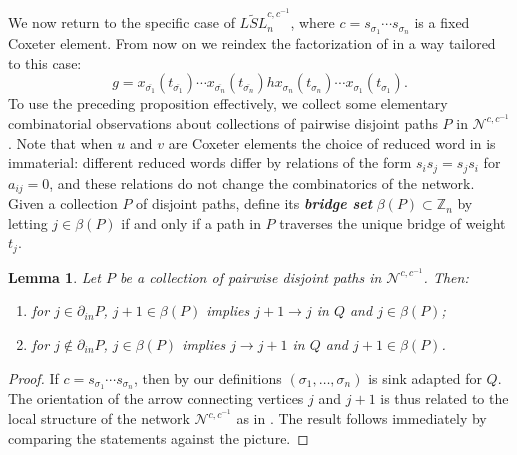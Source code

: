 \documentclass[12pt]{amsart}
\newcommand{\newword}[1]{\textbf{\emph{#1}}}
\newcommand{\ZZ}{\mathbb{Z}}
\newcommand{\cN}{\mathcal{N}} %
\newcommand{\ol}[1]{\overline{#1}}
\newtheorem{lemma}[theorem]{Lemma}
\theoremstyle{remark}
\numberwithin{equation}{section}
\numberwithin{figure}{section}
\begin{document}
We now return to the specific case of $\widetilde{LSL}_n^{c,c^{-1}}$, where $c = s_{\sigma_1}\cdots s_{\sigma_{n}}$ is a fixed Coxeter element.
From now on we reindex the factorization of  in a way tailored to this case:
\begin{equation}
  g = x_{\ol{\sigma_1}}(t_{\ol{\sigma_1}}) \cdots x_{\ol{\sigma_n}}(t_{\ol{\sigma_n}})h x_{\sigma_n}(t_{\sigma_n}) \cdots x_{\sigma_1}(t_{\sigma_1}).
  \label{eq:coxfactorization}
\end{equation}
To use the preceding proposition effectively, we collect some elementary combinatorial observations about collections of pairwise disjoint paths $P$ in $\cN^{c,c^{-1}}$.
Note that when $u$ and $v$ are Coxeter elements the choice of reduced word in  is immaterial: different reduced words differ by relations of the form $s_i s_j = s_j s_i$ for $a_{ij} = 0$, and these relations do not change the combinatorics of the network.
Given a collection $P$ of disjoint paths, define its \newword{bridge set} $\beta(P)\subset\ZZ_n$ by letting $j\in\beta(P)$ if and only if a path in $P$ traverses the unique bridge of weight $t_j$.

\begin{lemma}
  \label{lem:phi}
  Let $P$ be a collection of pairwise disjoint paths in $\cN^{c,c^{-1}}$.  Then:
  \begin{enumerate}
    \item for $j\in\partial_{in}P$, $j+1\in\beta(P)$ implies $j+1\to j$ in $Q$ and $j\in\beta(P)$;
    \item for $j\notin\partial_{in}P$, $j\in\beta(P)$ implies $j\to j+1$ in $Q$ and $j+1\in\beta(P)$.
  \end{enumerate}
\end{lemma}
\begin{proof}
  If $c = s_{\sigma_1}\cdots s_{\sigma_{n}}$, then by our definitions $(\sigma_1,\ldots,\sigma_{n})$ is sink adapted for $Q$.
  The orientation of the arrow connecting vertices $j$ and $j+1$ is thus related to the local structure of the network $\cN^{c,c^{-1}}$ as in .
  The result follows immediately by comparing the statements against the picture.
\end{proof} 
\end{document}
